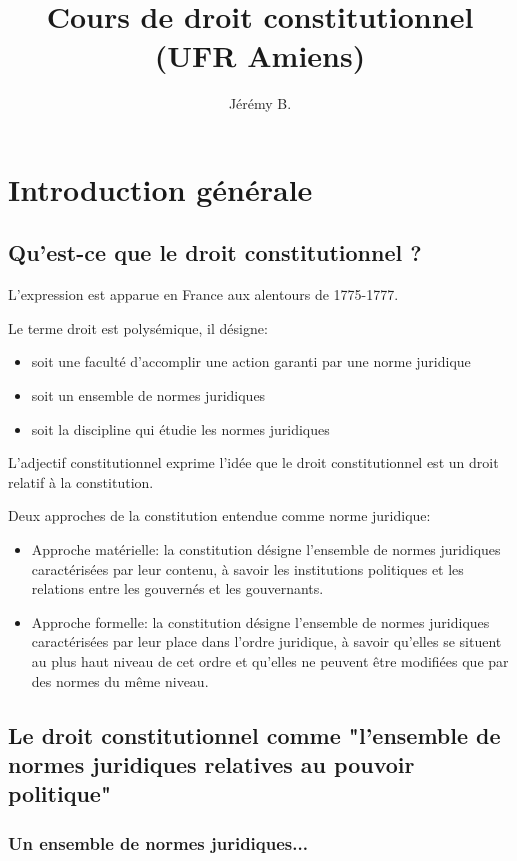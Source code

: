﻿\documentclass[12pt, a4paper, openany]{book}
\author{Jérémy B.}
\date{}
\title{Cours de droit constitutionnel (UFR Amiens)}
\begin{document}
\maketitle

\chapter{Introduction générale}

	\section{Qu'est-ce que le droit constitutionnel ?}

L'expression est apparue en France aux alentours de 1775-1777. 

Le terme droit est polysémique, il désigne:
\begin{itemize}
\item soit une faculté d'accomplir une action garanti par une norme juridique
\item soit un ensemble de normes juridiques
\item soit la discipline qui étudie les normes juridiques
\end{itemize}

L'adjectif constitutionnel exprime l'idée que le droit constitutionnel est un droit relatif à la constitution.

Deux approches de la constitution entendue comme norme juridique:
\begin{itemize}
\item Approche matérielle: la constitution désigne l'ensemble de normes juridiques caractérisées par leur contenu, à savoir les institutions politiques et les relations entre les gouvernés et les gouvernants.
\item Approche formelle: la constitution désigne l'ensemble de normes juridiques caractérisées par leur place dans l'ordre juridique, à savoir qu'elles se situent au plus haut niveau de cet ordre et qu'elles ne peuvent être modifiées que par des normes du même niveau.
\end{itemize}

	\section{Le droit constitutionnel comme "l'ensemble de normes juridiques relatives au pouvoir politique"}

		\subsection{Un ensemble de normes juridiques...}
\end{document}
